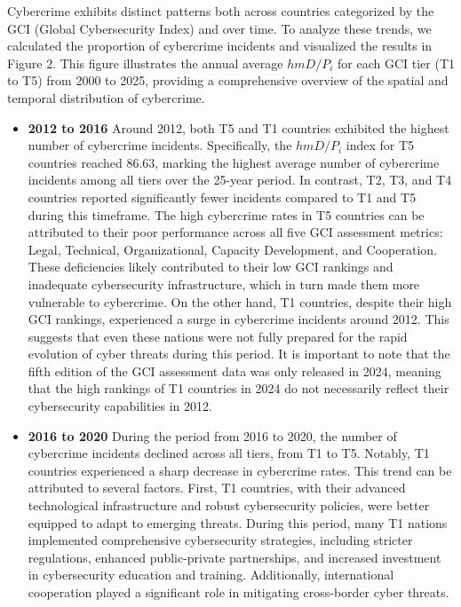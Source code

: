 	Cybercrime exhibits distinct patterns both across countries categorized by the GCI (Global Cybersecurity Index) and over time.
	To analyze these trends, we calculated the proportion of cybercrime incidents and visualized the results in Figure 2.
	This figure illustrates the annual average $hmD/P_i$ for each GCI tier (T1 to T5) from 2000 to 2025,
	providing a comprehensive overview of the spatial and temporal distribution of cybercrime.
	\begin{itemize}
		\item \textbf{2012 to 2016} Around 2012, both T5 and T1 countries exhibited the highest number of cybercrime incidents.
			Specifically, the $hmD/P_i$ index for T5 countries reached 86.63,
			marking the highest average number of cybercrime incidents among all tiers over the 25-year period.
			In contrast, T2, T3, and T4 countries reported significantly fewer incidents compared to T1 and T5 during this timeframe.
			The high cybercrime rates in T5 countries can be attributed to their poor performance across all five GCI assessment metrics:
			Legal, Technical, Organizational, Capacity Development, and Cooperation.
			These deficiencies likely contributed to their low GCI rankings and inadequate cybersecurity infrastructure,
			which in turn made them more vulnerable to cybercrime.
			On the other hand, T1 countries, despite their high GCI rankings, experienced a surge in cybercrime incidents around 2012.
			This suggests that even these nations were not fully prepared for the rapid evolution of cyber threats during this period.
			It is important to note that the fifth edition of the GCI assessment data was only released in 2024,
			meaning that the high rankings of T1 countries in 2024 do not necessarily reflect their cybersecurity capabilities in 2012.
		\item \textbf{2016 to 2020} During the period from 2016 to 2020, the number of cybercrime incidents declined across all tiers, from T1 to T5.
			Notably, T1 countries experienced a sharp decrease in cybercrime rates.
			This trend can be attributed to several factors.
			First, T1 countries, with their advanced technological infrastructure and robust cybersecurity policies,
			were better equipped to adapt to emerging threats.
			During this period, many T1 nations implemented comprehensive cybersecurity strategies,
			including stricter regulations, enhanced public-private partnerships, and increased investment in cybersecurity education and training.
			Additionally, international cooperation played a significant role in mitigating cross-border cyber threats.

\end{itemize}

